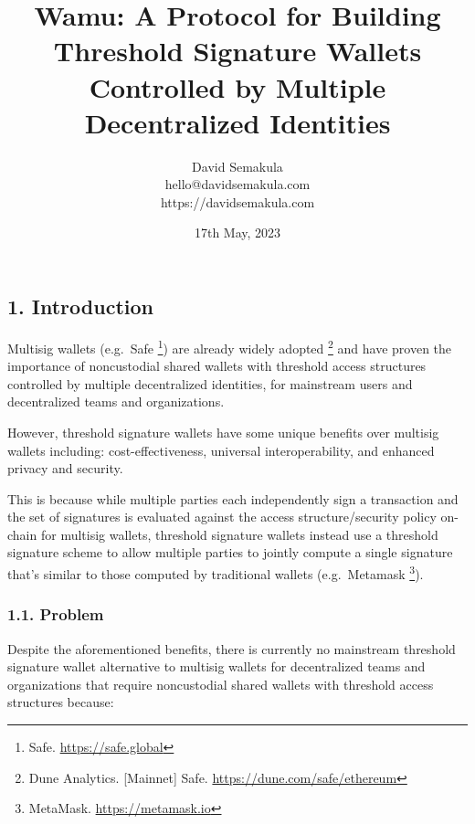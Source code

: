 \documentclass[
]{article}
\title{Wamu: A Protocol for Building Threshold Signature Wallets
Controlled by Multiple Decentralized Identities}
\author{David Semakula\\
hello@davidsemakula.com\\
https://davidsemakula.com}
\date{17th May, 2023}
\begin{document}
\maketitle

{
\setcounter{tocdepth}{3}
\tableofcontents
}
\hypertarget{introduction}{%
\subsection{1. Introduction}\label{introduction}}

Multisig wallets (e.g.~Safe \footnote{Safe. \url{https://safe.global}})
are already widely adopted \footnote{Dune Analytics. {[}Mainnet{]} Safe.
  \url{https://dune.com/safe/ethereum}} and have proven the importance
of noncustodial shared wallets with threshold access structures
controlled by multiple decentralized identities, for mainstream users
and decentralized teams and organizations.

However, threshold signature wallets have some unique benefits over
multisig wallets including: cost-effectiveness, universal
interoperability, and enhanced privacy and security.

This is because while multiple parties each independently sign a
transaction and the set of signatures is evaluated against the access
structure/security policy on-chain for multisig wallets, threshold
signature wallets instead use a threshold signature scheme to allow
multiple parties to jointly compute a single signature that's similar to
those computed by traditional wallets (e.g.~Metamask \footnote{MetaMask.
  \url{https://metamask.io}}).

\hypertarget{problem}{%
\subsubsection{1.1. Problem}\label{problem}}

Despite the aforementioned benefits, there is currently no mainstream
threshold signature wallet alternative to multisig wallets for
decentralized teams and organizations that require noncustodial shared
wallets with threshold access structures because:
\end{document}
